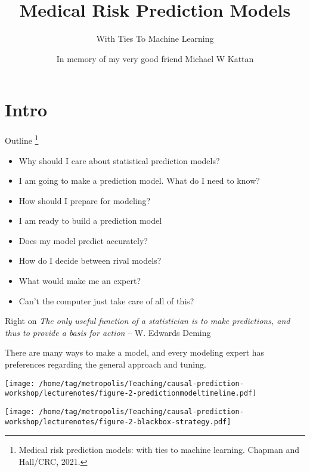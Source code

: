\documentclass{beamer}\usepackage{listings}
\institute{}
\subtitle{With Ties To Machine Learning}
\author{\vspace{3em}\newline In memory of my very good friend Michael W Kattan}
\date{}
\title{Medical Risk Prediction Models}
\begin{document}
\maketitle
\section{Intro}
\label{sec:org2455e19}

\begin{frame}[label={sec:org20d5415}]{Outline \footnote{Medical risk prediction models: with ties to machine learning. Chapman and Hall/CRC, 2021.}}
\begin{itemize}
\item Why should I care about statistical prediction models?
\item I am going to make a prediction model. What do I need to know?
\item How should I prepare for modeling?
\item I am ready to build a prediction model
\item Does my model predict accurately?
\item How do I decide between rival models?
\item What would make me an expert?
\item Can't the computer just take care of all of this?
\end{itemize}
\end{frame}
\begin{frame}[label={sec:org3bfa255}]{Right on}
\emph{The only useful function of a statistician is to make predictions, and thus to provide a basis for action} -- W. Edwards
Deming \vfill

There are many ways to make a model, and every modeling expert has
preferences regarding the general approach and tuning.
\vfill
\end{frame}
\begin{frame}[label={sec:org374be89}]{}
\begin{center}
\texttt{[image: /home/tag/metropolis/Teaching/causal-prediction-workshop/lecturenotes/figure-2-predictionmodeltimeline.pdf]}
\end{center}
\end{frame}
\begin{frame}[label={sec:org2130299}]{}
\begin{center}
\texttt{[image: /home/tag/metropolis/Teaching/causal-prediction-workshop/lecturenotes/figure-2-blackbox-strategy.pdf]}
\end{center}
\end{frame}
\end{document}
